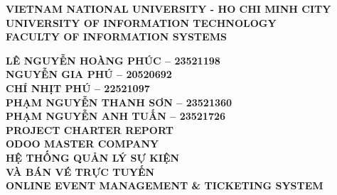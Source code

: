 \documentclass[13pt,a4paper]{extreport} %
\begin{document}
\begin{titlepage}

    \centering

    {\fontsize{14pt}{16.8pt}\selectfont\bfseries VIETNAM NATIONAL UNIVERSITY - HO CHI MINH CITY}\\[0.2cm]
    {\fontsize{16pt}{19.2pt}\selectfont\bfseries UNIVERSITY OF INFORMATION TECHNOLOGY}\\[0.2cm]
    {\fontsize{16pt}{19.2pt}\selectfont\bfseries FACULTY OF INFORMATION SYSTEMS}\\[1.5cm]

    \vspace{1.5cm} %

    {\fontsize{14pt}{16.8pt}\selectfont\bfseries LÊ NGUYỄN HOÀNG PHÚC – 23521198}\\[0.4cm]
    {\fontsize{14pt}{16.8pt}\selectfont\bfseries NGUYỄN GIA PHÚ – 20520692}\\[0.5cm]
    {\fontsize{14pt}{16.8pt}\selectfont\bfseries CHÍ NHỊT PHÚ – 22521097}\\[0.4cm]
    {\fontsize{14pt}{16.8pt}\selectfont\bfseries PHẠM NGUYỄN THANH SƠN – 23521360}\\[0.5cm]
    {\fontsize{14pt}{16.8pt}\selectfont\bfseries PHẠM NGUYỄN ANH TUẤN – 23521726}\\[0.6cm]
    
    {\fontsize{16pt}{19.2pt}\selectfont\bfseries PROJECT CHARTER REPORT}\\[0.6cm]
    {\fontsize{16pt}{19.2pt}\selectfont\bfseries ODOO MASTER COMPANY}\\[0.3cm]
    {\fontsize{22pt}{26.4pt}\selectfont\bfseries HỆ THỐNG QUẢN LÝ SỰ KIỆN\\VÀ BÁN VÉ TRỰC TUYẾN}\\[0.5cm]
    {\color{red}\fontsize{16pt}{19.2pt}\selectfont\bfseries ONLINE EVENT MANAGEMENT \& TICKETING SYSTEM}\\[2cm]


\end{titlepage}
\end{document}
